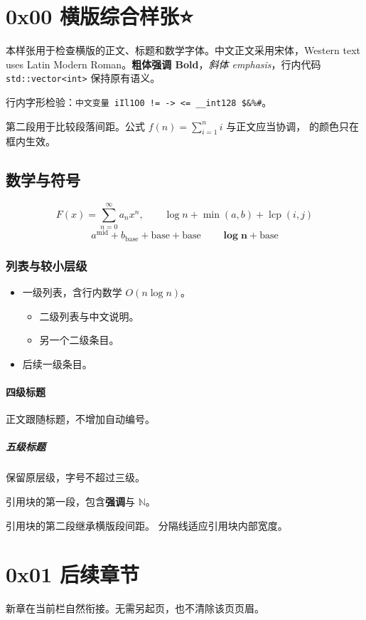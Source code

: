 \documentclass{article}
\begin{document}
\section{0x00 横版综合样张⭐}
本样张用于检查横版的正文、标题和数学字体。中文正文采用宋体，Western text uses Latin Modern Roman。\textbf{粗体强调 Bold}，\emph{斜体 emphasis}，行内代码 \texttt{std::vector<int>} 保持原有语义。

行内字形检验：\texttt{中文变量 iIl1O0 != -> <= \_\_int128 \$\&\%\#}。


第二段用于比较段落间距。公式 $f(n)=\sum_{i=1}^n i$ 与正文应当协调， 的颜色只在框内生效。
\subsection{数学与符号🚩}
\[
  F(x)=\sum_{n=0}^{\infty}a_nx^n,\qquad
  \log n+\min(a,b)+\operatorname{lcp}(i,j)
\]
\[
 a^\mathrm{mid}+b_\mathrm{base}+\mathrm{base}+\text{base}
 \qquad \boldsymbol{\log n+\mathrm{base}}
\]
\subsubsection{列表与较小层级}
\begin{itemize}
\item 一级列表，含行内数学 $O(n\log n)$。
\begin{itemize}\item 二级列表与中文说明。\item 另一个二级条目。\end{itemize}
\item 后续一级条目。
\end{itemize}
\paragraph{四级标题}正文跟随标题，不增加自动编号。
\subparagraph{五级标题}保留原层级，字号不超过三级。
\begin{quoteblock}
引用块的第一段，包含\textbf{强调}与 $\mathbb{N}$。

引用块的第二段继承横版段间距。
\Separator{}
分隔线适应引用块内部宽度。
\end{quoteblock}
\section{0x01 后续章节}
新章在当前栏自然衔接。无需另起页，也不清除该页页眉。
\end{document}
